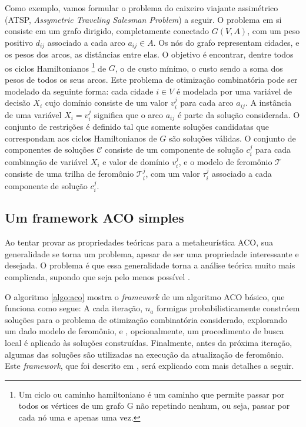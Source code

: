 Como exemplo, vamos formular o problema do caixeiro viajante assimétrico
(ATSP,
\textit{Assymetric Traveling Salesman Problem}) a seguir. O problema em si
consiste em um grafo dirigido, completamente conectado $G(V, A)$, com um peso
positivo $d_{ij}$ associado a cada arco $a_{ij} \in A$. Os nós do grafo
representam cidades, e os pesos dos arcos, as distâncias entre elas. O objetivo
é encontrar, dentre todos os ciclos Hamiltonianos \footnote{Um ciclo ou caminho
hamiltoniano é um caminho que permite passar por todos os vértices de um grafo
G não repetindo nenhum, ou seja, passar por cada nó uma e apenas uma vez.} de
$G$, o de custo mínimo, o custo sendo a soma dos pesos de todos os seus arcos.
Este problema de otimização combinatória pode ser modelado da seguinte forma:
cada cidade $i \in V$ é modelada por uma variável de decisão $X_{i}$ cujo
domínio consiste de um valor $v_{i}^{j}$ para cada arco $a_{ij}$. A instância
de uma variável $X_{i} = v_{i}^{j}$ significa que o arco $a_{ij}$ é parte da
solução considerada. O conjunto de restrições é definido tal que somente
soluções candidatas que correspondam aos ciclos Hamiltonianos de $G$ são
soluções válidas. O conjunto de componentes de soluções $\mathcal{C}$ consiste
de um componente de solução $c_{i}^{j}$ para cada combinação de variável
$X_{i}$ e valor de domínio $v_{i}^{j}$, e o modelo de feromônio $\mathcal{T}$
consiste de uma trilha de feromônio $\mathcal{T}_{i}^{j}$, com um valor
$\tau_{i}^{j}$ associado a cada componente de solução $c_{i}^{j}$. 

\subsection{Um framework ACO simples}
Ao tentar provar as propriedades teóricas para a metaheurística ACO, sua
generalidade se torna um problema, apesar de ser uma propriedade interessante e
desejada. O problema é que essa generalidade torna a análise teórica muito mais
complicada, supondo que seja pelo menos possível \cite{dorigo2005ant}.

O algoritmo \ref{algo:aco} mostra o \textit{framework} de um algoritmo ACO
básico, que funciona como segue: A cada iteração, $n_{a}$ formigas
probabilisticamente constróem soluções para o problema de otimização
combinatória considerado, explorando um dado modelo de feromônio, e
, opcionalmente, um procedimento de busca local é aplicado às soluções
construídas. Finalmente, antes da próxima iteração, algumas das soluções são
utilizadas na execução da atualização de feromônio. Este \textit{framework},
que foi descrito em \cite{dorigo2005ant}, será explicado com mais detalhes a
seguir.

